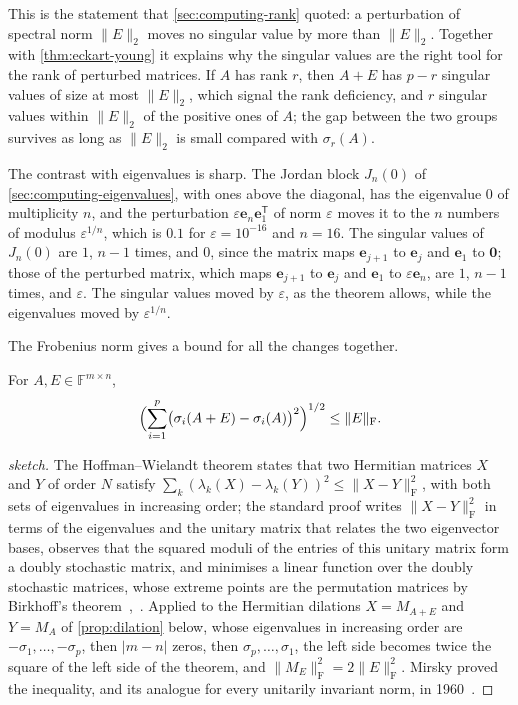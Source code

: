 This is the statement that \cref{sec:computing-rank} quoted: a perturbation of spectral norm $\|E\|_2$ moves no singular value by more than $\|E\|_2$. Together with \cref{thm:eckart-young} it explains why the singular values are the right tool for the rank of perturbed matrices. If $A$ has rank $r$, then $A+E$ has $p-r$ singular values of size at most $\|E\|_2$, which signal the rank deficiency, and $r$ singular values within $\|E\|_2$ of the positive ones of $A$; the gap between the two groups survives as long as $\|E\|_2$ is small compared with $\sigma_r(A)$.

The contrast with eigenvalues is sharp. The Jordan block $J_n(0)$ of \cref{sec:computing-eigenvalues}, with ones above the diagonal, has the eigenvalue $0$ of multiplicity $n$, and the perturbation $\varepsilon\mathbf e_n\mathbf e_1^{\mathsf T}$ of norm $\varepsilon$ moves it to the $n$ numbers of modulus $\varepsilon^{1/n}$, which is $0.1$ for $\varepsilon=10^{-16}$ and $n=16$. The singular values of $J_n(0)$ are $1$, $n-1$ times, and $0$, since the matrix maps $\mathbf e_{j+1}$ to $\mathbf e_j$ and $\mathbf e_1$ to $\mathbf 0$; those of the perturbed matrix, which maps $\mathbf e_{j+1}$ to $\mathbf e_j$ and $\mathbf e_1$ to $\varepsilon\mathbf e_n$, are $1$, $n-1$ times, and $\varepsilon$. The singular values moved by $\varepsilon$, as the theorem allows, while the eigenvalues moved by $\varepsilon^{1/n}$.

The Frobenius norm gives a bound for all the changes together.

\begin{theorem}[Mirsky]
\label{thm:mirsky}
For $A,E\in\mathbb F^{m\times n}$,
\[
\Bigl(\sum_{i=1}^p\bigl(\sigma_i(A+E)-\sigma_i(A)\bigr)^2\Bigr)^{1/2}\le\|E\|_{\mathrm F}.
\]
\end{theorem}

\begin{proof}[sketch]
The Hoffman--Wielandt theorem states that two Hermitian matrices $X$ and $Y$ of order $N$ satisfy $\sum_k(\lambda_k(X)-\lambda_k(Y))^2\le\|X-Y\|_{\mathrm F}^2$, with both sets of eigenvalues in increasing order; the standard proof writes $\|X-Y\|_{\mathrm F}^2$ in terms of the eigenvalues and the unitary matrix that relates the two eigenvector bases, observes that the squared moduli of the entries of this unitary matrix form a doubly stochastic matrix, and minimises a linear function over the doubly stochastic matrices, whose extreme points are the permutation matrices by Birkhoff's theorem~\cite{hoffman1953},~\cite[Sect.~6.3]{horn2013}. Applied to the Hermitian dilations $X=M_{A+E}$ and $Y=M_A$ of \cref{prop:dilation} below, whose eigenvalues in increasing order are $-\sigma_1,\ldots,-\sigma_p$, then $|m-n|$ zeros, then $\sigma_p,\ldots,\sigma_1$, the left side becomes twice the square of the left side of the theorem, and $\|M_E\|_{\mathrm F}^2=2\|E\|_{\mathrm F}^2$. Mirsky proved the inequality, and its analogue for every unitarily invariant norm, in 1960~\cite{mirsky1960}.
\end{proof}

